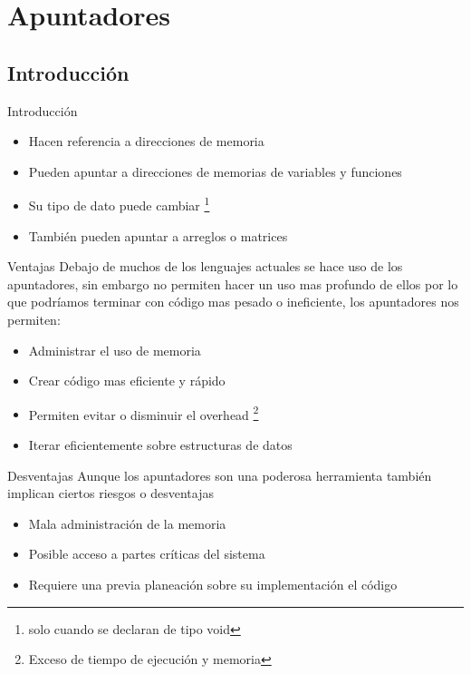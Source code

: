 \documentclass{beamer}
\begin{document}
\section{Apuntadores}

\subsection{Introducci\'on}

\begin{frame}{Introducci\'on}
	\begin{itemize}
		\item Hacen referencia a direcciones de memoria
		\item Pueden apuntar a direcciones de memorias de variables y funciones
		\item Su tipo de dato puede cambiar \footnote{solo cuando se declaran de tipo void}
		\item Tambi\'en pueden apuntar a arreglos o matrices
	\end{itemize}
\end{frame}

\begin{frame}{Ventajas}
	Debajo de muchos de los lenguajes actuales se hace uso de los apuntadores, sin embargo no permiten hacer un uso mas profundo de ellos por lo que podr\'iamos terminar con c\'odigo mas pesado o ineficiente, los apuntadores nos permiten:
	\begin{itemize}
		\item Administrar el uso de memoria
		\item Crear c\'odigo mas eficiente y r\'apido
		\item Permiten evitar o disminuir el overhead \footnote{Exceso de tiempo de ejecuci\'on y memoria}
		\item Iterar eficientemente sobre estructuras de datos 
	\end{itemize}
\end{frame}

\begin{frame}{Desventajas}
	Aunque los apuntadores son una poderosa herramienta tambi\'en implican ciertos riesgos o desventajas
	\begin{itemize}
		\item Mala administraci\'on de la memoria
		\item Posible acceso a partes cr\'iticas del sistema
		\item Requiere una previa planeaci\'on sobre su implementaci\'on el c\'odigo
	\end{itemize}
\end{frame}
\end{document}
